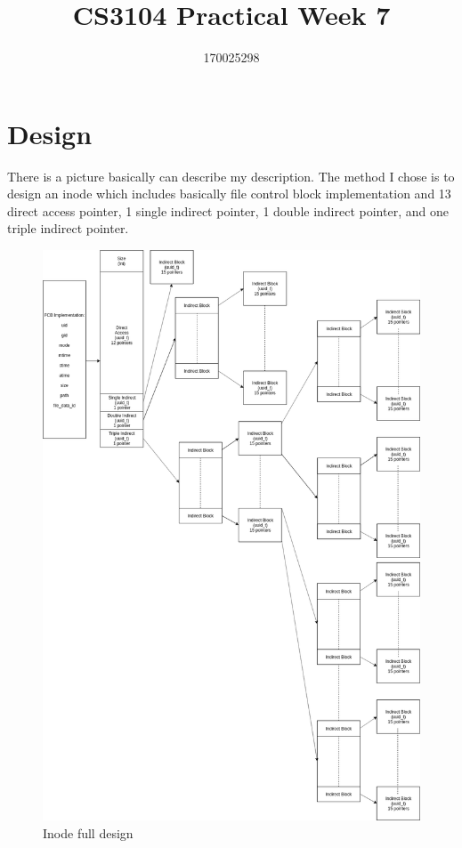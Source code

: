 \documentclass[legalpaper]{article}
\title{\vspace{-4cm}CS3104 Practical Week 7}
\author{170025298}
\date{}
\begin{document}
	\maketitle
	\section{Design}
	There is a picture basically can describe my description. The method I chose is to design an inode which includes basically file control block implementation and 13 direct access pointer, 1 single indirect pointer, 1 double indirect pointer, and one triple indirect pointer.\par
	\begin{figure}[H]
	\centering
	\includegraphics[width = \textwidth]{inode}
	\caption{Inode full design}
	\end{figure}
\end{document}
